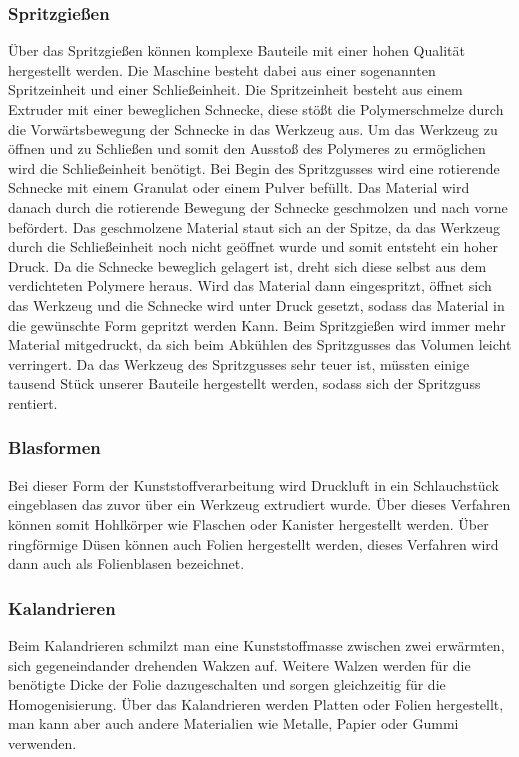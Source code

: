 \subsubsection{Spritzgießen}
Über das Spritzgießen können komplexe Bauteile mit einer hohen Qualität hergestellt werden. Die Maschine besteht dabei aus
einer sogenannten Spritzeinheit und einer Schließeinheit. Die Spritzeinheit besteht aus einem Extruder mit einer
beweglichen Schnecke, diese stößt die Polymerschmelze durch die Vorwärtsbewegung der Schnecke in das Werkzeug aus.
Um das Werkzeug zu öffnen und zu Schließen und somit den Ausstoß des Polymeres zu ermöglichen wird die Schließeinheit
benötigt.
Bei Begin des Spritzgusses wird eine rotierende Schnecke mit einem Granulat oder einem Pulver befüllt. Das Material
wird danach durch die rotierende Bewegung der Schnecke geschmolzen und nach vorne befördert. Das geschmolzene Material
staut sich an der Spitze, da das Werkzeug durch die Schließeinheit noch nicht geöffnet wurde und somit entsteht ein
hoher Druck. Da die Schnecke beweglich gelagert ist, dreht sich diese selbst aus dem verdichteten Polymere heraus.
Wird das Material dann eingespritzt, öffnet sich das Werkzeug und die Schnecke wird unter Druck gesetzt, sodass das
Material in die gewünschte Form gepritzt werden Kann.
Beim Spritzgießen wird immer mehr Material mitgedruckt, da sich beim Abkühlen des Spritzgusses das Volumen leicht
verringert.
Da das Werkzeug des Spritzgusses sehr teuer ist, müssten einige tausend Stück unserer Bauteile hergestellt werden,
sodass sich der Spritzguss rentiert.

\subsubsection{Blasformen}
Bei dieser Form der Kunststoffverarbeitung wird Druckluft in ein Schlauchstück eingeblasen das zuvor über ein Werkzeug
extrudiert wurde. Über dieses Verfahren können somit Hohlkörper wie Flaschen oder Kanister hergestellt werden.
Über ringförmige Düsen können auch Folien hergestellt werden, dieses Verfahren wird dann auch als Folienblasen bezeichnet.

\subsubsection{Kalandrieren}
Beim Kalandrieren schmilzt man eine Kunststoffmasse zwischen zwei erwärmten, sich gegeneindander drehenden Wakzen auf.
Weitere Walzen werden für die benötigte Dicke der Folie dazugeschalten und sorgen gleichzeitig für die Homogenisierung.
Über das Kalandrieren werden Platten oder Folien hergestellt, man kann aber auch andere Materialien wie Metalle, Papier
oder Gummi verwenden.

